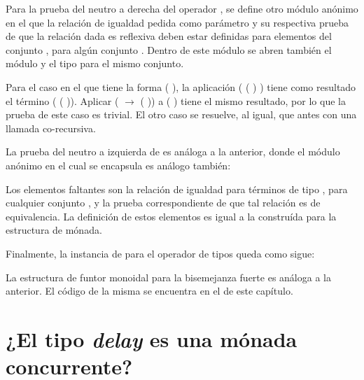 \begin{AgdaAlign}
Para la prueba del neutro a derecha del operador , se define otro módulo anónimo en el que la relación de igualdad pedida como parámetro y su respectiva prueba de que la relación dada es reflexiva deben estar definidas para elementos del conjunto  \AgdaDatatype{$\times$ $\top$}, para algún conjunto . Dentro de este módulo se abren también el módulo  y el tipo  para el mismo conjunto.


Para el caso en el que  tiene la forma ( ), la aplicación ( ( ) ) tiene como resultado el término ( ( )). Aplicar  (  $\rightarrow$ ( )) a ( ) tiene el mismo resultado, por lo que la prueba de este caso es trivial. El otro caso se resuelve, al igual, que antes con una llamada co-recursiva. 

La prueba del neutro a izquierda de  es análoga a la anterior, donde el módulo anónimo en el cual se encapsula es análogo también:


Los elementos faltantes son la relación de igualdad para términos de tipo  \AgdaDatatype{$\bot$}, para cualquier conjunto , y la prueba correspondiente de que tal relación es de equivalencia. La definición de estos elementos es igual a la construída para la estructura de mónada.


Finalmente, la instancia de  para el operador de tipos \AgdaDatatype{$\_\bot$} queda como sigue:

\end{AgdaAlign} 

La estructura de funtor monoidal para la bisemejanza fuerte es análoga a la anterior. El código de la misma se encuentra en el  de este capítulo. 

\section{¿El tipo \textit{delay} es una mónada concurrente?}\label{casodelay:concmonad}

